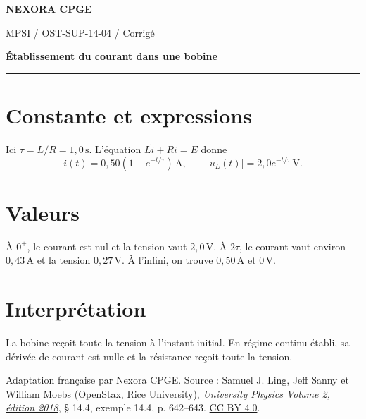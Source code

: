 \documentclass[11pt,a4paper]{article}
\begin{document}
\makeatletter
\def\@oddfoot{\footnotesize Download for free at \url{https://openstax.org/details/books/university-physics-volume-2}.\hfil\thepage}
\let\@evenfoot\@oddfoot
\makeatother
{\small\bfseries\color{nexorablue} NEXORA CPGE}\par
{\small MPSI / OST-SUP-14-04 / Corrigé}\par
{\LARGE\bfseries Établissement du courant dans une bobine}\par
\vspace{0.25em}\hrule\vspace{0.6em}

\section*{Constante et expressions}
Ici $\tau=L/R=1{,}0\,\mathrm s$. L’équation $L\dot i+Ri=E$ donne
\[ i(t)=0{,}50(1-e^{-t/\tau})\,\mathrm A,\qquad |u_L(t)|=2{,}0e^{-t/\tau}\,\mathrm V. \]

\section*{Valeurs}
À $0^+$, le courant est nul et la tension vaut $2{,}0\,\mathrm V$. À $2\tau$, le courant vaut environ $0{,}43\,\mathrm A$ et la tension $0{,}27\,\mathrm V$. À l’infini, on trouve $0{,}50\,\mathrm A$ et $0\,\mathrm V$.

\section*{Interprétation}
La bobine reçoit toute la tension à l’instant initial. En régime continu établi, sa dérivée de courant est nulle et la résistance reçoit toute la tension.

\bigskip
{\footnotesize Adaptation française par Nexora CPGE. Source : Samuel J. Ling, Jeff Sanny et William Moebs (OpenStax, Rice University),
\href{https://d3bxy9euw4e147.cloudfront.net/oscms-prod/media/documents/UniversityPhysicsVolume2-OP.pdf\#page=652}{\textit{University Physics Volume 2, édition 2018}}, § 14.4, exemple 14.4, p. 642–643.
\href{https://creativecommons.org/licenses/by/4.0/}{CC BY 4.0}.}
\end{document}
